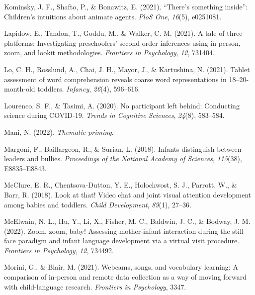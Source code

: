 \documentclass[
  man,floatsintext]{apa6}
\newlength{\cslhangindent}
\newlength{\cslentryspacingunit} %
\newenvironment{CSLReferences}[2] %
 {%
  \setlength{\parindent}{0pt}
  \ifodd #1
  \let\oldpar\par
  \def\par{\hangindent=\cslhangindent\oldpar}
  \fi
  \setlength{\parskip}{#2\cslentryspacingunit}
 }%
 {}
\begin{document}
\begin{CSLReferences}{1}{0}
\leavevmode{}%
Kominsky, J. F., Shafto, P., \& Bonawitz, E. (2021). {``There's something inside''}: Children's intuitions about animate agents. \emph{PloS One}, \emph{16}(5), e0251081.

\leavevmode{}%
Lapidow, E., Tandon, T., Goddu, M., \& Walker, C. M. (2021). A tale of three platforms: Investigating preschoolers' second-order inferences using in-person, zoom, and lookit methodologies. \emph{Frontiers in Psychology}, \emph{12}, 731404.

\leavevmode{}%
Lo, C. H., Rosslund, A., Chai, J. H., Mayor, J., \& Kartushina, N. (2021). Tablet assessment of word comprehension reveals coarse word representations in 18--20-month-old toddlers. \emph{Infancy}, \emph{26}(4), 596--616.

\leavevmode{}%
Lourenco, S. F., \& Tasimi, A. (2020). No participant left behind: Conducting science during COVID-19. \emph{Trends in Cognitive Sciences}, \emph{24}(8), 583--584.

\leavevmode{}%
Mani, N. (2022). \emph{Thematic priming}.

\leavevmode{}%
Margoni, F., Baillargeon, R., \& Surian, L. (2018). Infants distinguish between leaders and bullies. \emph{Proceedings of the National Academy of Sciences}, \emph{115}(38), E8835--E8843.

\leavevmode{}%
McClure, E. R., Chentsova-Dutton, Y. E., Holochwost, S. J., Parrott, W., \& Barr, R. (2018). Look at that! Video chat and joint visual attention development among babies and toddlers. \emph{Child Development}, \emph{89}(1), 27--36.

\leavevmode{}%
McElwain, N. L., Hu, Y., Li, X., Fisher, M. C., Baldwin, J. C., \& Bodway, J. M. (2022). Zoom, zoom, baby! Assessing mother-infant interaction during the still face paradigm and infant language development via a virtual visit procedure. \emph{Frontiers in Psychology}, \emph{12}, 734492.

\leavevmode{}%
Morini, G., \& Blair, M. (2021). Webcams, songs, and vocabulary learning: A comparison of in-person and remote data collection as a way of moving forward with child-language research. \emph{Frontiers in Psychology}, 3347.


\end{CSLReferences}
\end{document}
